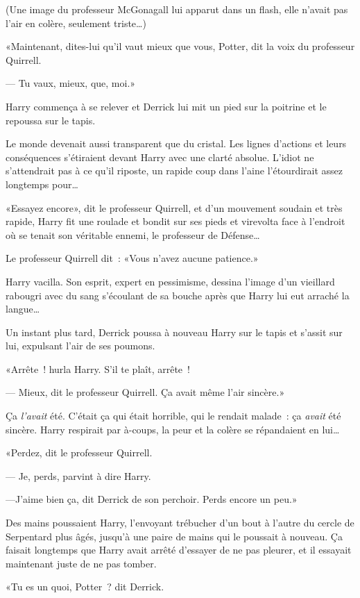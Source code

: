 (Une image du professeur McGonagall lui apparut dans un flash, elle n'avait pas l'air en colère, seulement triste…)

«Maintenant, dites-lui qu'il vaut mieux que vous, Potter, dit la voix du professeur Quirrell.

--- Tu vaux, mieux, que, moi.»

Harry commença à se relever et Derrick lui mit un pied sur la poitrine et le repoussa sur le tapis.

Le monde devenait aussi transparent que du cristal. Les lignes d'actions et leurs conséquences s'étiraient devant Harry avec une clarté absolue. L'idiot ne s'attendrait pas à ce qu'il riposte, un rapide coup dans l'aine l'étourdirait assez longtemps pour…

«Essayez encore», dit le professeur Quirrell, et d'un mouvement soudain et très rapide, Harry fit une roulade et bondit sur ses pieds et virevolta face à l'endroit où se tenait son véritable ennemi, le professeur de Défense…

Le professeur Quirrell dit~: «Vous n'avez aucune patience.»

Harry vacilla. Son esprit, expert en pessimisme, dessina l'image d'un vieillard rabougri avec du sang s'écoulant de sa bouche après que Harry lui eut arraché la langue…

Un instant plus tard, Derrick poussa à nouveau Harry sur le tapis et s'assit sur lui, expulsant l'air de ses poumons.

«Arrête~! hurla Harry. S'il te plaît, arrête~!

--- Mieux, dit le professeur Quirrell. Ça avait même l'air sincère.»

Ça \emph{l'avait} été. C'était ça qui était horrible, qui le rendait malade~: ça \emph{avait} été sincère. Harry respirait par à-coups, la peur et la colère se répandaient en lui…

«Perdez, dit le professeur Quirrell.

--- Je, perds, parvint à dire Harry.

---J'aime bien ça, dit Derrick de son perchoir. Perds encore un peu.»

\later

Des mains poussaient Harry, l'envoyant trébucher d'un bout à l'autre du cercle de Serpentard plus âgés, jusqu'à une paire de mains qui le poussait à nouveau. Ça faisait longtemps que Harry avait arrêté d'essayer de ne pas pleurer, et il essayait maintenant juste de ne pas tomber.

«Tu es un quoi, Potter~? dit Derrick.

